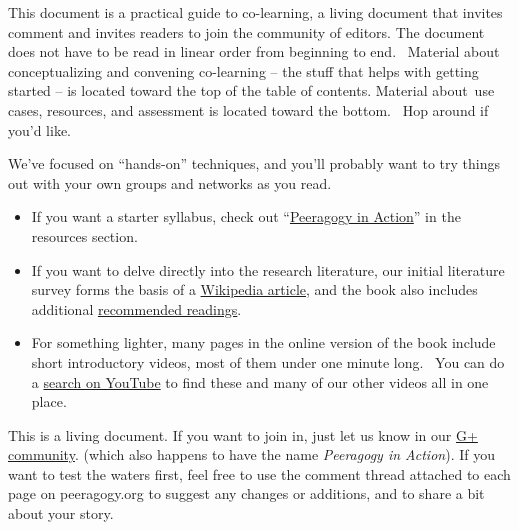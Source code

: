 This document is a practical guide to co-learning, a living document
that invites comment and invites readers to join the community of
editors. The document does not have to be read in linear order from
beginning to end.~ Material about conceptualizing and convening
co-learning -- the stuff that helps with getting started -- is located
toward the top of the table of contents. Material about~use cases,
resources, and assessment is located toward the bottom.~ Hop around if
you'd like.

We've focused on ``hands-on'' techniques, and you'll probably want to
try things out with your own groups and networks as you read.

\begin{itemize}
\itemsep1pt\parskip0pt
\item
  If you want a starter syllabus, check out
  ``\href{http://peeragogy.org/peeragogy-in-action/}{Peeragogy in
  Action}'' in the resources section.
\item
  If you want to delve directly into the research literature, our
  initial literature survey forms the basis of a
  \href{https://en.wikipedia.org/wiki/Peer_learning}{Wikipedia article},
  and the book also includes additional
  \href{http://peeragogy.org/recommended-reading/}{recommended
  readings}.
\item
  For something lighter, many pages in the online version of the book
  include short introductory videos, most of them under one minute
  long.~ You can do a
  \href{http://www.youtube.com/results?search_query=peeragogy\&sm=3}{search
  on YouTube} to find these and many of our other videos all in one
  place.
\end{itemize}

This is a living document. If you want to join in, just let us know in
our \href{https://plus.google.com/communities/107386162349686249470}{G+
community}. (which also happens to have the name \emph{Peeragogy in
Action}). If you want to test the waters first, feel free to use the
comment thread attached to each page on peeragogy.org to suggest any
changes or additions, and to share a bit about your story.


